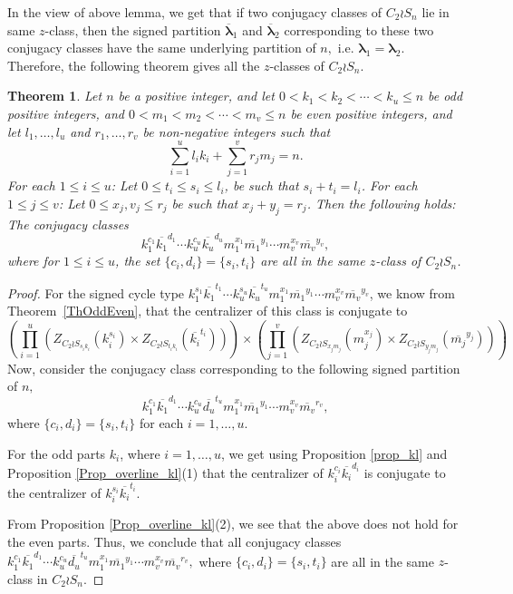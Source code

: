 \documentclass[12pt,twoside,reqno]{amsart}
\newtheorem{theorem}{Theorem}[section]
\theoremstyle{definition}
\numberwithin{equation}{section}
\newcommand{\Lbd}{\bm {\lambda}}
\begin{document}
In the view of above lemma, we get that if two conjugacy classes of $C_2 \wr S_n$ lie in same $z$-class, then the signed partition $\overline{\Lbd}_1$ and $\overline{\Lbd}_2$ corresponding to these two conjugacy classes have the same underlying partition of $n,$ i.e. $\Lbd_1=\Lbd_2.$ Therefore, the following theorem gives all the $z$-classes of $C_2 \wr S_n.$

\begin{theorem}\label{ZThOddEven}
Let $n$ be a positive integer, and let $0 <k_1<k_2 < \cdots < k_u \leq n$ be odd positive integers, and $0 < m_1 < m_2< \cdots < m_v \leq n$ be even positive integers,  and let $l_1, \ldots, l_u$ and $r_1,\ldots, r_v$ be non-negative integers such that $$\sum_{i= 1}^ul_ik_i + \sum_{j=1}^v r_jm_j  =n.$$  
For each $ 1 \leq  i \leq u$: Let $0 \leq t_i \leq s_i \leq l_i$, be such that $s_i + t_i = l_i$. For each $1\leq j \leq v$: Let $0 \leq x_j,v_j \leq r_j$ be such that $x_j + y_j = r_j$. Then the following holds:
The conjugacy classes $$k_1^{c_1}\overline{k_1}^{d_1}\cdots k_u^{c_u}\overline{k_u}^{d_u}m_1^{x_1}\overline{m_1}^{y_1}\cdots m_v^{x_v}\overline{m_v}^{y_v},$$ where for $1\leq i \leq u$, the set $\{c_i ,d_i\} = \{s_i,t_i\}$ are all in the same $z$-class of $C_2 \wr S_n$.
\end{theorem}
\begin{proof} For the signed cycle type $k_1^{s_1}\overline{k_1}^{t_1}\cdots k_u^{s_u}\overline{k_u}^{t_u}m_1^{x_1}\overline{m_1}^{y_1}\cdots m_v^{x_v}\overline{m_v}^{y_v}$, we know from Theorem~\ref{ThOddEven}, that the centralizer of this class is conjugate to $$ \left(\prod_{i=1}^u (Z_{C_2 \wr S_{s_ik_i}}(k_i^{s_i})\times Z_{C_2\wr S_{t_ik_i}}(\overline{k_i}^{t_i})) \right)\times \left(\prod_{j=1}^v (Z_{C_2\wr S_{x_jm_j}}(m_j^{x_j})\times Z_{C_2 \wr S_{y_jm_j}}(\overline{m_j}^{y_j})) \right)$$
Now, consider the conjugacy class corresponding to the following signed partition of $n,$ $$k_1^{c_1}\overline{k_1}^{d_1}\cdots k_u^{c_u}\overline{d_u}^{t_u}m_1^{x_1}\overline{m_1}^{y_1}\cdots m_v^{x_v}\overline{m_v}^{r_v},$$ where $\{c_i, d_i\} = \{s_i, t_i\}$ for each $i = 1,\ldots,u$. 

For the odd parts $k_i$, where $i = 1,\ldots, u$, we get using Proposition \ref{prop_kl} and Proposition \ref{Prop_overline_kl}(1) that the centralizer of $k_i^{c_i}\overline{k_i}^{d_i}$ is conjugate to the centralizer of $k_i^{s_i}\overline{k_i}^{t_i}$. 

From Proposition \ref{Prop_overline_kl}(2), we see that the above does not hold for the even parts. Thus, we conclude that all conjugacy classes $k_1^{c_1}\overline{k_1}^{d_1}\cdots k_u^{c_u}\overline{d_u}^{t_u}m_1^{x_1}\overline{m_1}^{y_1}\cdots m_v^{x_v}\overline{m_v}^{r_v},$ where $\{c_i,d_i\} = \{s_i, t_i\}$ are all in the same $z$-class in $C_2 \wr S_n$. \end{proof}
\end{document}
